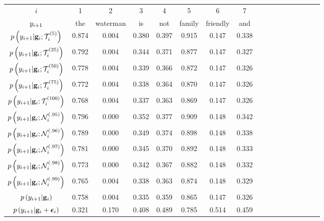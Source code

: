 \begin{table}[p]
    \centering
    \begin{tabular}{c ccc ccc ccc ccc ccc c}
        \toprule
        $i$ & 1 & 2 & 3 & 4 &5 & 6 & 7\\
        $y_{i+1}$ &  the  & waterman &is &not& family & friendly & and \\
        \midrule
        $p\left(y_{i+1}|\mathbf{g}_i; {\mathcal{T}}_{i}^{(5)}\right)$ & 0.874 & 0.004 & 0.380 & 0.397 & 0.915 & 0.147  & 0.338 \\
        $p\left(y_{i+1}|\mathbf{g}_i; {\mathcal{T}}_{i}^{(25)}\right)$ &
        0.792 & 0.004 & 0.344 & 0.371 & 0.877 & 0.147 & 0.327 \\
        $p\left(y_{i+1}|\mathbf{g}_i; {\mathcal{T}}_{i}^{(50)}\right)$ &
        0.778 & 0.004 & 0.339 & 0.366 & 0.872 & 0.147 & 0.326 \\
        $p\left(y_{i+1}|\mathbf{g}_i; {\mathcal{T}}_{i}^{(75)}\right)$ &
        0.772 & 0.004 & 0.338 & 0.364 & 0.870 & 0.147 & 0.326 \\
        $p\left(y_{i+1}|\mathbf{g}_i; {\mathcal{T}}_{i}^{(100)}\right)$ & 
        0.768 & 0.004 & 0.337 & 0.363 & 0.869 & 0.147 & 0.326 \\
        \midrule
        $p\left(y_{i+1}|\mathbf{g}_i; {\mathcal{N}}_{i}^{(.95)}\right)$     & 
        0.796 & 0.000 & 0.352 & 0.377 & 0.909 & 0.148 & 0.342 \\
        $p\left(y_{i+1}|\mathbf{g}_i; {\mathcal{N}}_{i}^{(.96)}\right)$ &
        0.789 & 0.000 & 0.349 & 0.374 & 0.898 & 0.148 & 0.338 \\
        $p\left(y_{i+1}|\mathbf{g}_i; {\mathcal{N}}_{i}^{(.97)}\right)$ &
        0.781 & 0.000 & 0.345 & 0.370 & 0.892 & 0.148 & 0.333 \\
        $p\left(y_{i+1}|\mathbf{g}_i; {\mathcal{N}}_{i}^{(.98)}\right)$ &
        0.773 & 0.000 & 0.342 & 0.367 & 0.882 & 0.148 & 0.332 \\ 
        $p\left(y_{i+1}|\mathbf{g}_i; {\mathcal{N}}_{i}^{(.99)}\right)$ &
        0.765 & 0.004 & 0.338 & 0.363 & 0.874 & 0.148 & 0.329 \\
        \midrule
        $p\left(y_{i+1}|\mathbf{g}_i\right)$ &0.758 & 0.004 & 0.335 & 0.359 & 0.865 & 0.147 & 0.326 \\
        $p\left(y_{i+1}|\mathbf{g}_i + \boldsymbol{\epsilon}_i\right)$ & 0.321 & 0.170 & 0.408 & 0.489 & 0.785 & 0.514 & 0.459 \\
        \bottomrule
    \end{tabular}


\end{table}
